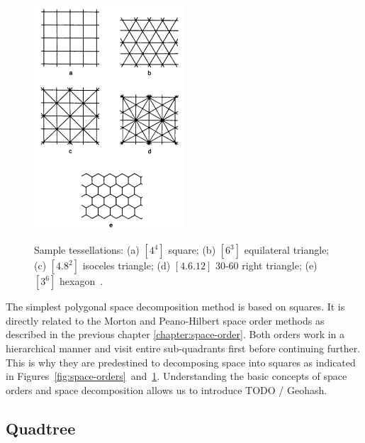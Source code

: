 \begin{figure}[h]
  \begin{center}
    \includegraphics[width=0.5\textwidth]{figures/space_decompositions.png}
    \label{fig:space-decompositions}
    \caption{Sample tessellations: (a) $[4^4]$ square; (b) $[6^3]$ equilateral triangle; (c) $[4.8^2]$ isoceles triangle; (d) $[4.6.12]$ 30-60 right triangle; (e) $[3^6]$ hexagon~\cite[p 17]{Samet90spatialdata}.}
  \end{center}
\end{figure}

The simplest polygonal space decomposition method is based on squares. It is directly related to the Morton and Peano-Hilbert space order methods as described in the previous chapter \ref{chapter:space-order}. Both orders work in a hierarchical manner and visit entire sub-quadrants first before continuing further. This is why they are predestined to decomposing space into squares as indicated in Figures~\ref{fig:space-orders}~and~\ref{fig:space-decompositions}. Understanding the basic concepts of space orders and space decomposition allows us to introduce TODO / Geohash.

\subsection{Quadtree}






